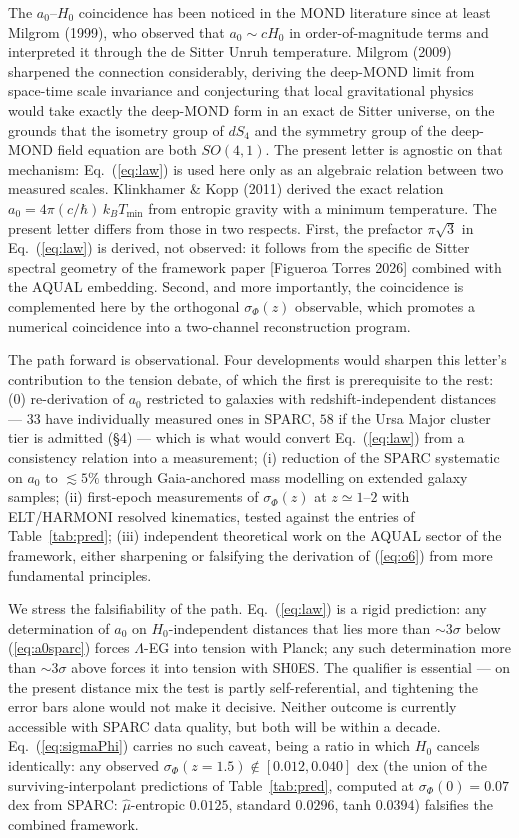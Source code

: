 \documentclass[11pt,a4paper]{article}
\begin{document}
The $a_0$--$H_0$ coincidence has been noticed in the MOND literature since
at least Milgrom (1999), who observed that $a_0 \sim cH_0$ in
order-of-magnitude terms and interpreted it through the de Sitter Unruh
temperature. Milgrom (2009) sharpened the connection considerably, deriving
the deep-MOND limit from space-time scale invariance and conjecturing that
local gravitational physics would take exactly the deep-MOND form in an
exact de Sitter universe, on the grounds that the isometry group of $dS_4$
and the symmetry group of the deep-MOND field equation are both $SO(4,1)$.
The present letter is agnostic on that mechanism: Eq.~(\ref{eq:law}) is used
here only as an algebraic relation between two measured scales.
Klinkhamer \& Kopp (2011) derived the exact relation
$a_0 = 4\pi (c/\hbar)\, k_B T_{\min}$ from entropic gravity with a minimum
temperature. The present letter differs from those in two respects.
First, the prefactor $\pi\sqrt{3}$ in Eq.~(\ref{eq:law}) is derived, not
observed: it follows from the specific de Sitter spectral geometry of the
framework paper [Figueroa Torres 2026] combined with the AQUAL embedding.
Second, and more importantly, the coincidence is complemented here by the
orthogonal $\sigma_\Phi(z)$ observable, which promotes a numerical
coincidence into a two-channel reconstruction program.

The path forward is observational. Four developments would sharpen this
letter's contribution to the tension debate, of which the first is
prerequisite to the rest:
(0) re-derivation of $a_0$ restricted to galaxies with redshift-independent
distances --- $33$ have individually measured ones in SPARC, $58$ if the
Ursa Major cluster tier is admitted (\S4) --- which is what would convert
Eq.~(\ref{eq:law}) from a consistency relation into a measurement;
(i) reduction of the SPARC systematic on $a_0$ to $\lesssim 5\%$ through
Gaia-anchored mass modelling on extended galaxy samples;
(ii) first-epoch measurements of $\sigma_\Phi(z)$ at $z \simeq 1$--$2$ with
ELT/HARMONI resolved kinematics, tested against the entries of
Table~\ref{tab:pred};
(iii) independent theoretical work on the AQUAL sector of the framework,
either sharpening or falsifying the derivation of (\ref{eq:o6}) from more
fundamental principles.

We stress the falsifiability of the path. Eq.~(\ref{eq:law}) is a rigid
prediction: any determination of $a_0$ on $H_0$-independent distances that
lies more than $\sim 3\sigma$ below (\ref{eq:a0sparc}) forces $\Lambda$-EG
into tension with Planck; any such determination more than $\sim 3\sigma$
above forces it into tension with SH0ES. The qualifier is essential --- on
the present distance mix the test is partly self-referential, and tightening
the error bars alone would not make it decisive. Neither outcome is
currently accessible with SPARC data quality, but both will be within a
decade. Eq.~(\ref{eq:sigmaPhi}) carries no such caveat, being a ratio in
which $H_0$ cancels identically: any observed $\sigma_\Phi(z=1.5) \notin [0.012, 0.040]$
dex (the union of the surviving-interpolant predictions of
Table~\ref{tab:pred}, computed at $\sigma_\Phi(0)=0.07$ dex from SPARC:
$\hat\mu$-entropic $0.0125$, standard $0.0296$, tanh $0.0394$)
falsifies the combined framework.
\end{document}
